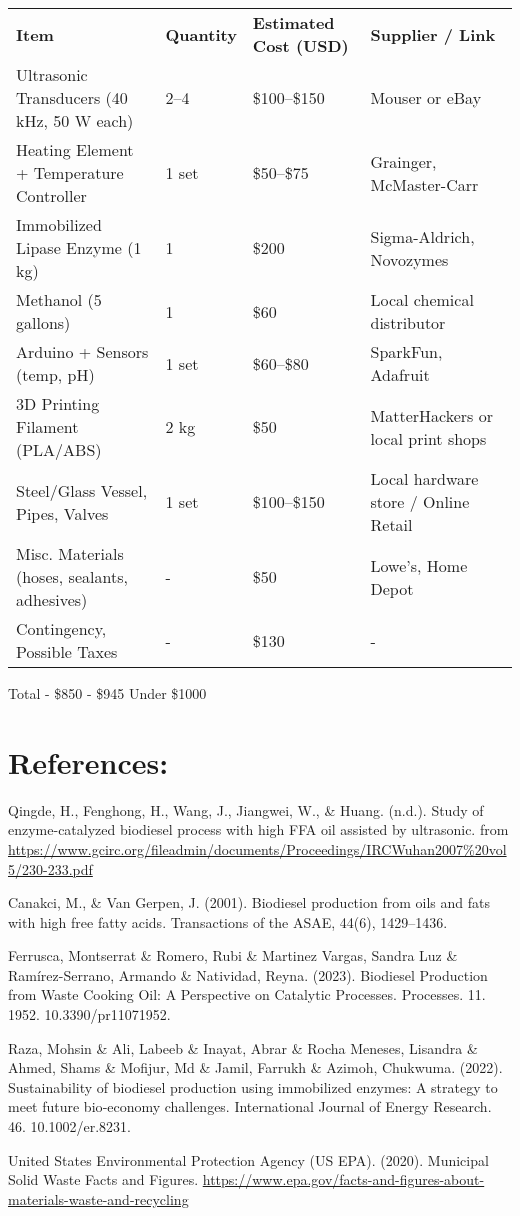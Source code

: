 \documentclass[10pt,twocolumn]{article}
\begin{document}
\noindent
\begin{tabular}{p{6cm} p{2.5cm} p{3cm} p{3cm}}
\textbf{Item} & \textbf{Quantity} & \textbf{Estimated Cost (USD)} & \textbf{Supplier / Link} \\
Ultrasonic Transducers (40 kHz, 50 W each) & 2--4 & \$100--\$150 & Mouser or eBay \\
Heating Element + Temperature Controller & 1 set & \$50--\$75 & Grainger, McMaster-Carr \\
Immobilized Lipase Enzyme (1 kg) & 1 & \$200 & Sigma-Aldrich, Novozymes \\
Methanol (5 gallons) & 1 & \$60 & Local chemical distributor \\
Arduino + Sensors (temp, pH) & 1 set & \$60--\$80 & SparkFun, Adafruit \\
3D Printing Filament (PLA/ABS) & 2 kg & \$50 & MatterHackers or local print shops \\
Steel/Glass Vessel, Pipes, Valves & 1 set & \$100--\$150 & Local hardware store / Online Retail \\
Misc. Materials (hoses, sealants, adhesives) & - & \$50 & Lowe’s, Home Depot \\
Contingency, Possible Taxes & - & \$130 & - \\
\end{tabular}

\bigskip
\noindent
Total \quad - \quad \$850 - \$945 \quad Under \$1000

\section*{References:}

Qingde, H., Fenghong, H., Wang, J., Jiangwei, W., \& Huang. (n.d.). Study of enzyme-catalyzed biodiesel process with high FFA oil assisted by ultrasonic. from \url{https://www.gcirc.org/fileadmin/documents/Proceedings/IRCWuhan2007%20vol5/230-233.pdf}

Canakci, M., \& Van Gerpen, J. (2001). Biodiesel production from oils and fats with high free fatty acids. Transactions of the ASAE, 44(6), 1429–1436.

Ferrusca, Montserrat \& Romero, Rubi \& Martinez Vargas, Sandra Luz \& Ramírez-Serrano, Armando \& Natividad, Reyna. (2023). Biodiesel Production from Waste Cooking Oil: A Perspective on Catalytic Processes. Processes. 11. 1952. 10.3390/pr11071952. 

Raza, Mohsin \& Ali, Labeeb \& Inayat, Abrar \& Rocha Meneses, Lisandra \& Ahmed, Shams \& Mofijur, Md \& Jamil, Farrukh \& Azimoh, Chukwuma. (2022). Sustainability of biodiesel production using immobilized enzymes: A strategy to meet future bio‐economy challenges. International Journal of Energy Research. 46. 10.1002/er.8231. 

United States Environmental Protection Agency (US EPA). (2020). Municipal Solid Waste Facts and Figures. \url{https://www.epa.gov/facts-and-figures-about-materials-waste-and-recycling}
\end{document}
